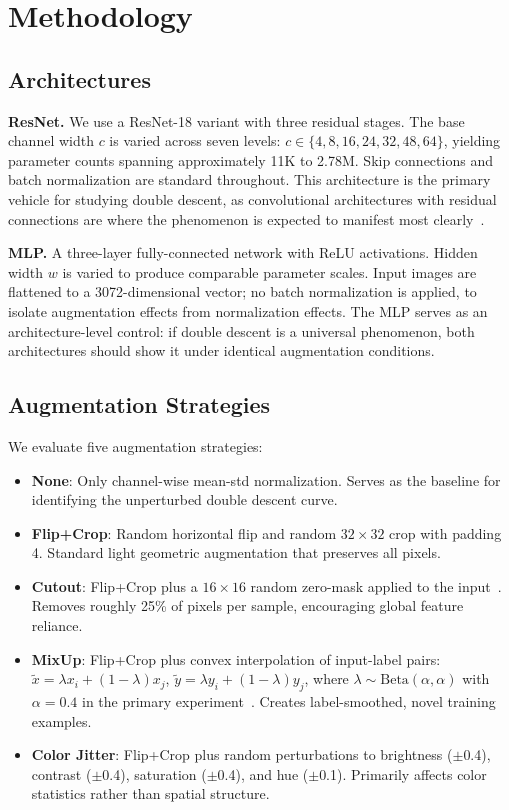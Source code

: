 \section{Methodology}

\subsection{Architectures}

\textbf{ResNet.} We use a ResNet-18 variant with three residual stages. The base channel width $c$ is varied across seven levels: $c \in \{4, 8, 16, 24, 32, 48, 64\}$, yielding parameter counts spanning approximately 11K to 2.78M. Skip connections and batch normalization are standard throughout. This architecture is the primary vehicle for studying double descent, as convolutional architectures with residual connections are where the phenomenon is expected to manifest most clearly~\cite{nakkiran2020deep}.

\textbf{MLP.} A three-layer fully-connected network with ReLU activations. Hidden width $w$ is varied to produce comparable parameter scales. Input images are flattened to a 3072-dimensional vector; no batch normalization is applied, to isolate augmentation effects from normalization effects. The MLP serves as an architecture-level control: if double descent is a universal phenomenon, both architectures should show it under identical augmentation conditions.

\subsection{Augmentation Strategies}

We evaluate five augmentation strategies:

\begin{itemize}
    \item \textbf{None}: Only channel-wise mean-std normalization. Serves as the baseline for identifying the unperturbed double descent curve.
    \item \textbf{Flip+Crop}: Random horizontal flip and random $32{\times}32$ crop with padding 4. Standard light geometric augmentation that preserves all pixels.
    \item \textbf{Cutout}: Flip+Crop plus a $16{\times}16$ random zero-mask applied to the input~\cite{devries2017cutout}. Removes roughly 25\% of pixels per sample, encouraging global feature reliance.
    \item \textbf{MixUp}: Flip+Crop plus convex interpolation of input-label pairs: $\tilde{x} = \lambda x_i + (1-\lambda)x_j$, $\tilde{y} = \lambda y_i + (1-\lambda)y_j$, where $\lambda \sim \text{Beta}(\alpha, \alpha)$ with $\alpha{=}0.4$ in the primary experiment~\cite{zhang2018mixup}. Creates label-smoothed, novel training examples.
    \item \textbf{Color Jitter}: Flip+Crop plus random perturbations to brightness ($\pm$0.4), contrast ($\pm$0.4), saturation ($\pm$0.4), and hue ($\pm$0.1). Primarily affects color statistics rather than spatial structure.
\end{itemize}

